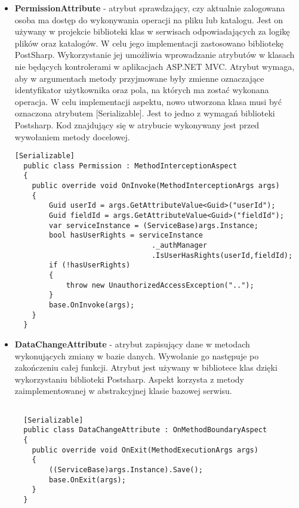 \begin{itemize}
\begin{lstlisting}[caption=Wykorzystanie atrybutu AjaxAction]
  \end{lstlisting}
  \item \textbf{PermissionAttribute} - atrybut sprawdzający, czy aktualnie zalogowana osoba ma dostęp do wykonywania operacji na pliku lub katalogu. Jest on używany w projekcie biblioteki klas w serwisach odpowiadających za logikę plików oraz katalogów. W celu jego implementacji zastosowano bibliotekę PostSharp. Wykorzystanie jej umożliwia wprowadzanie atrybutów w klasach nie będących kontrolerami w aplikacjach ASP.NET MVC. Atrybut wymaga, aby w argumentach metody przyjmowane były zmienne oznaczające identyfikator użytkownika oraz pola, na których ma zostać wykonana operacja. W celu implementacji aspektu, nowo utworzona klasa musi być oznaczona atrybutem [Serializable]. Jest to jedno z wymagań biblioteki Postsharp. Kod znajdujący się w atrybucie wykonywany jest przed wywołaniem metody docelowej.
  \newpage
  \begin{lstlisting}[caption=Aspekt potwierdzający uprawnienia zalogowanego użytkownik do wykonywania operacji na pliku lub katalogu ]
  [Serializable]
  public class Permission : MethodInterceptionAspect
  {
  	public override void OnInvoke(MethodInterceptionArgs args)
  	{
  		Guid userId = args.GetAttributeValue<Guid>("userId");
  		Guid fieldId = args.GetAttributeValue<Guid>("fieldId");
  		var serviceInstance = (ServiceBase)args.Instance;
  		bool hasUserRights = serviceInstance
  								._authManager
  								.IsUserHasRights(userId,fieldId);
  		if (!hasUserRights)
  		{
  			throw new UnauthorizedAccessException("..");
  		}
  		base.OnInvoke(args);
  	}	
  }
  \end{lstlisting}
  \item \textbf{DataChangeAttribute} - atrybut zapisujący dane w metodach wykonujących zmiany w bazie danych. Wywołanie go następuje po zakończeniu całej funkcji. Atrybut jest używany w bibliotece klas dzięki wykorzystaniu biblioteki Postsharp. Aspekt korzysta z metody zaimplementowanej w abstrakcyjnej klasie bazowej serwisu.
  \\
\begin{lstlisting}[caption=Aspekt zapisujący dane w bazie danych]
  
  [Serializable]
  public class DataChangeAttribute : OnMethodBoundaryAspect
  {
  	public override void OnExit(MethodExecutionArgs args)
  	{
  		((ServiceBase)args.Instance).Save();
  		base.OnExit(args);
  	}
  }
  \end{lstlisting}  
\end{itemize}
\newpage

